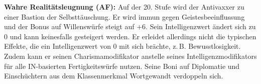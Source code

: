 \documentclass[
	ngerman,
	a4paper,
	10pt,
	twocolumn,
]{scrartcl}
\begin{document}
\textbf{Wahre Realitätsleugnung (AF):} Auf der 20. Stufe wird der Antivaxxer zu einer Bastion der Selbsttäuschung. Er wird immun gegen Geistesbeeinflussung und der Bonus auf Willenswürfe steigt auf +6. Sein Intelligenzwert ändert sich zu 0 und kann keinesfalls gesteigert werden. Er erleidet allerdings nicht die typischen Effekte, die ein Intelligenzwert von 0 mit sich brächte, z.\,B. Bewusstlosigkeit. Zudem kann er seinen Charismamodifikator anstelle seines Intelligenzmodifikators für alle IN-basierten Fertigkeitswürfe nutzen. Seine Boni auf Diplomatie und Einschüchtern aus dem Klassenmerkmal Wortgewandt verdoppeln sich.



\end{document}
